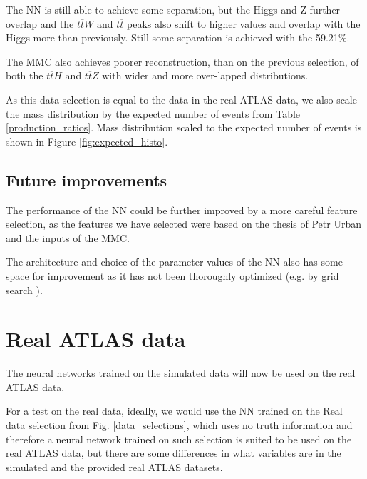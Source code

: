 \documentclass{ctuthesis}
\begin{document}
The NN is still able to achieve some separation, but the Higgs and Z further overlap and the $t\overline{t}W$ and $t\overline{t}$ peaks also shift to higher values and overlap with the Higgs more than previously. Still some separation is achieved with the 59.21\%.

The MMC also achieves poorer reconstruction, than on the previous selection, of both the $t\overline{t}H$ and $t\overline{t}Z$ with wider and more over-lapped distributions.

As this data selection is equal to the data in the real ATLAS data, we also scale the mass distribution by the expected number of events from Table \ref{production_ratios}. Mass distribution scaled to the expected number of events is shown in Figure \ref{fig:expected_histo}.

\begin{figure}[h]
\end{figure}

\subsection{Future improvements}
The performance of the NN could be further improved by a more careful feature selection, as the features we have selected were based on the thesis of Petr Urban \cite{decay_channel_image} and the inputs of the MMC.

The architecture and choice of the parameter values of the NN also has some space for improvement as it has not been thoroughly optimized (e.g. by grid search \cite[p.125]{data_augmentation}).

\section{Real ATLAS data}
The neural networks trained on the simulated data will now be used on the real ATLAS data.

For a test on the real data, ideally, we would use the NN trained on the Real data selection from Fig. \ref{data_selections}, which uses no truth information and therefore a neural network trained on such selection is suited to be used on the real ATLAS data, but there are some differences in what variables are in the simulated and the provided real ATLAS datasets.
\end{document}
